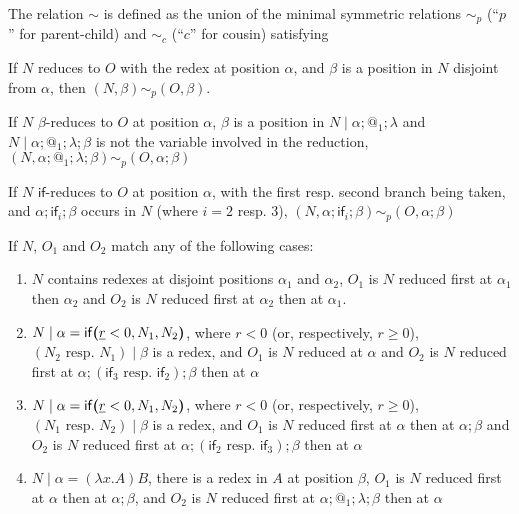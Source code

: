 \begin{definition}
The relation $\sim$ is defined as the union of the minimal symmetric relations $\sim_p$ (``$p$'' for parent-child) and $\sim_c$ (``$c$'' for cousin) satisfying
\begin{asparaenum}[(i)]
    \item If $N$ reduces to $O$ with the redex at position $\alpha$, and $\beta$ is a position in $N$ disjoint from $\alpha$, then $(N,\beta) \sim_p (O,\beta)$.
    
    \item If $N$ $\beta$-reduces to $O$ at position $\alpha$, $\beta$ is a position in $N \mid \alpha;@_1;\lambda$ and $N \mid \alpha;@_1;\lambda;\beta$ is not the variable involved in the reduction, $(N,\alpha;@_1;\lambda;\beta) \sim_p (O, \alpha;\beta)$
    
    \item If $N$ $\textsf{if}$-reduces to $O$ at position $\alpha$, with the first resp. second branch being taken, and $\alpha;\textsf{if}_i;\beta$ occurs in $N$ (where $i = 2$ resp. $3$), $(N,\alpha;\textsf{if}_i;\beta) \sim_p (O,\alpha;\beta)$
    
    \item If $N$, $O_1$ and $O_2$ match any of the following cases:
    \begin{enumerate}
        \item $N$ contains redexes at disjoint positions $\alpha_1$ and $\alpha_2$, $O_1$ is $N$ reduced first at $\alpha_1$ then $\alpha_2$ and $O_2$ is $N$ reduced first at $\alpha_2$ then at $\alpha_1$.
        
        \item $N \mid \alpha = \mathsf{if}\boldsymbol{(}\underline r < 0, N_1, N_2\boldsymbol{)}$, where $r < 0$ (or, respectively, $r \geq 0$), $(N_2 \text{ resp. } N_1) \mid \beta$ is a redex, and $O_1$ is $N$ reduced at $\alpha$ and $O_2$ is $N$ reduced first at $\alpha;(\textsf{if}_3 \text{ resp. } \textsf{if}_2);\beta$ then at $\alpha$
        
        \item $N \mid \alpha = \mathsf{if}\boldsymbol{(}\underline r < 0, N_1, N_2\boldsymbol{)}$, where $r < 0$ (or, respectively, $r \geq 0$), $(N_1 \text{ resp. } N_2) \mid \beta$ is a redex, and $O_1$ is $N$ reduced first at $\alpha$ then at $\alpha;\beta$ and $O_2$ is $N$ reduced first at $\alpha;(\textsf{if}_2 \text{ resp. } \textsf{if}_3);\beta$ then at $\alpha$
        
        \item $N \mid \alpha = (\lambda x. A) B$, there is a redex in $A$ at position $\beta$, $O_1$ is $N$ reduced first at $\alpha$ then at $\alpha;\beta$, and $O_2$ is $N$ reduced first at $\alpha;@_1;\lambda;\beta$ then at $\alpha$
        

\end{enumerate}
\end{asparaenum}
\end{definition}
